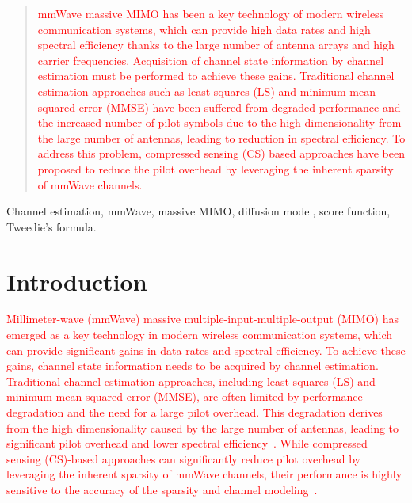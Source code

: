 \documentclass[lettersize,journal]{IEEEtran}
\begin{document}
\maketitle
\begin{abstract}
\textcolor{red}{
  mmWave massive MIMO has been a key technology of modern wireless communication systems, which can provide high data rates and high spectral efficiency thanks to the large number of antenna arrays and high carrier frequencies. Acquisition of channel state information by channel estimation must be performed to achieve these gains. Traditional channel estimation approaches such as least squares (LS) and minimum mean squared error (MMSE) have been suffered from degraded performance and the increased number of pilot symbols due to the high dimensionality from the large number of antennas, leading to reduction in spectral efficiency. To address this problem, compressed sensing (CS) based approaches have been proposed to reduce the pilot overhead by leveraging the inherent sparsity of mmWave channels.
}
\end{abstract}

\begin{IEEEkeywords}
Channel estimation, mmWave, massive MIMO, diffusion model, score function, Tweedie's formula.
\end{IEEEkeywords}


\section{Introduction}

\textcolor{red}{
Millimeter-wave (mmWave) massive multiple-input-multiple-output (MIMO) has emerged as a key technology in modern wireless communication systems, which can provide significant gains in data rates and spectral efficiency. To achieve these gains, channel state information needs to be acquired by channel estimation. Traditional channel estimation approaches, including least squares (LS) and minimum mean squared error (MMSE), are often limited by performance degradation and the need for a large pilot overhead. This degradation derives from the high dimensionality caused by the large number of antennas, leading to significant pilot overhead and lower spectral efficiency~\cite{hassibiHowMuchTraining2003}. While compressed sensing (CS)-based approaches can significantly reduce pilot overhead by leveraging the inherent sparsity of mmWave channels, their performance is highly sensitive to the accuracy of the sparsity and channel modeling~\cite{zhangAtomicNormDenoisingBased2018,mendez-rialHybridMIMOArchitectures2016,choiCompressedSensingWireless2017}.
}
\end{document}
